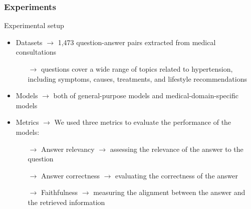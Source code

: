 \documentclass[handout]{beamer}\mode<handout>{\usetheme{AMSBolognaFC}}
\begin{document}
\begin{frame}[allowframebreaks]
\frametitle{Experiments}

    \begin{block}{Experimental setup}
        \begin{itemize}
            \item Datasets $\rightarrow$ \alert{1,473} question-answer pairs extracted from medical consultations
            \begin{itemize}
                \item[$\rightarrow$] questions cover a wide range of topics related to hypertension, including \alert{symptoms}, \alert{causes}, \alert{treatments}, and \alert{lifestyle recommendations}
            \end{itemize}
            \item Models $\rightarrow$ both of general-purpose models and medical-domain-specific models
            \item Metrics $\rightarrow$ We used three metrics to evaluate the performance of the models:
            \begin{itemize}
                \item[$\rightarrow$] Answer relevancy $\rightarrow$ assessing the \alert{relevance} of the answer to the question
                \item[$\rightarrow$] Answer correctness $\rightarrow$ evaluating the \alert{correctness} of the answer
                \item[$\rightarrow$] Faithfulness $\rightarrow$ measuring the \alert{alignment} between the answer and the retrieved information
            \end{itemize}
        \end{itemize}
    \end{block}

    \framebreak


\end{frame}
\end{document}
